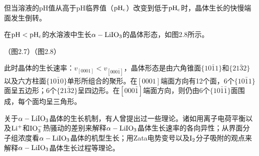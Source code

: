 但当溶液的pH值从高于pH临界值（$\rm pH_c$）改变到低于$\rm pH_c$时，晶体生长的快慢端面发生倒转。

在$\rm pH<pH_c$的水溶液中生长$\rm\alpha-LiIO_3$的晶体形态，如图2.8所示。

（图2.7）（图2.8）

此时晶体的生长速率：$v_{[0001]}<v_{[000\bar{1}]}$，晶体形态是由六角锥面$\{10\bar{1}1\}$和$\{21\bar{3}2\}$以及六方柱面$\{10\bar{1}0\}$单形所组合的聚形。在$[0001]$端面方向有12个面，6个$\{10\bar{1}1\}$面呈五边形；6个$\{21\bar{3}2\}$呈四边形。在$[000\bar{1}]$端面方向，则仍由6个$\{10\bar{1}\bar{1}\}$面围成，每个面均呈三角形。

关于$\rm\alpha-LiIO_3$晶体的生长机制，有人曾提出过一些理论。诸如用离子电荷平衡以及$\rm Li^+$和$\rm IO_3^-$热骚动的差别来解释$\rm\alpha-LiIO_3$晶体生长速率的各向异性；从界面分子组浓度看$\rm\alpha-LiIO_3$晶体的机型生长；用Zata电势变号以及$\rm I_2$分子吸附的观点来解释$\rm\alpha-LiIO_3$晶体生长过程等理论。

